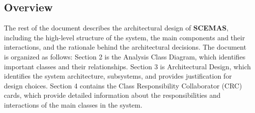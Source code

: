 {\subsection{Overview}
\label{sub:overview}
The rest of the document describes the architectural design of \textbf{\textbf{SCEMAS}}, including the high-level structure of the system, the main components and their interactions, and the rationale behind the architectural decisions. The document is organized as follows:
Section 2 is the Analysis Class Diagram, which identifies important classes and their relationships.
Section 3 is Architectural Design, which identifies the system architecture, subsystems, and provides justification for design choices.
Section 4 contains the Class Responsibility Collaborator (CRC) cards, which provide detailed information about the responsibilities and interactions of the main classes in the system.

}